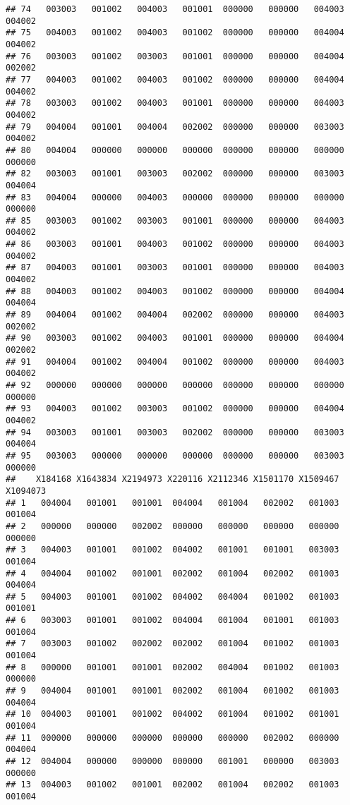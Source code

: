 \documentclass[
]{article}
\begin{document}
\begin{verbatim}
## 74   003003   001002   004003   001001  000000   000000   004003   004002
## 75   004003   001002   004003   001002  000000   000000   004004   004002
## 76   003003   001002   003003   001001  000000   000000   004004   002002
## 77   004003   001002   004003   001002  000000   000000   004004   004002
## 78   003003   001002   004003   001001  000000   000000   004003   004002
## 79   004004   001001   004004   002002  000000   000000   003003   004002
## 80   004004   000000   000000   000000  000000   000000   000000   000000
## 82   003003   001001   003003   002002  000000   000000   003003   004004
## 83   004004   000000   004003   000000  000000   000000   000000   000000
## 85   003003   001002   003003   001001  000000   000000   004003   004002
## 86   003003   001001   004003   001002  000000   000000   004003   004002
## 87   004003   001001   003003   001001  000000   000000   004003   004002
## 88   004003   001002   004003   001002  000000   000000   004004   004004
## 89   004004   001002   004004   002002  000000   000000   004003   002002
## 90   003003   001002   004003   001001  000000   000000   004004   002002
## 91   004004   001002   004004   001002  000000   000000   004003   004002
## 92   000000   000000   000000   000000  000000   000000   000000   000000
## 93   004003   001002   003003   001002  000000   000000   004004   004002
## 94   003003   001001   003003   002002  000000   000000   003003   004004
## 95   003003   000000   000000   000000  000000   000000   003003   000000
##    X184168 X1643834 X2194973 X220116 X2112346 X1501170 X1509467 X1094073
## 1   004004   001001   001001  004004   001004   002002   001003   001004
## 2   000000   000000   002002  000000   000000   000000   000000   000000
## 3   004003   001001   001002  004002   001001   001001   003003   001004
## 4   004004   001002   001001  002002   001004   002002   001003   004004
## 5   004003   001001   001002  004002   004004   001002   001003   001001
## 6   003003   001001   001002  004004   001004   001001   001003   001004
## 7   003003   001002   002002  002002   001004   001002   001003   001004
## 8   000000   001001   001001  002002   004004   001002   001003   000000
## 9   004004   001001   001001  002002   001004   001002   001003   004004
## 10  004003   001001   001002  004002   001004   001002   001001   001004
## 11  000000   000000   000000  000000   000000   002002   000000   004004
## 12  004004   000000   000000  000000   001001   000000   003003   000000
## 13  004003   001002   001001  002002   001004   002002   001003   001004

\end{verbatim}
\end{document}
